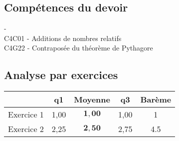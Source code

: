 \documentclass[12pt]{article}
\begin{document}
\newpage

\subsection{Compétences du devoir}

    
    \begin{center}
         -  \\
 C4C01 - Additions de nombres relatifs\\
C4G22 - Contraposée du théorème de Pythagore
    \end{center}


    
\subsection{Analyse par exercices}

    
    \begin{center}
        \begin{tabular}{|c|c|c|c|c|}
\hline
 & q1 & Moyenne & q3 & Barème \\ \hline
Exercice 1 & {\scriptsize 1{,}00} & $\mathbf{1{,}00}$ & {\scriptsize 1{,}00} & 1 \\ \hline
Exercice 2 & {\scriptsize 2{,}25} & $\mathbf{2{,}50}$ & {\scriptsize 2{,}75} & 4.5 \\ \hline
\end{tabular}
    \end{center}

\end{document}
